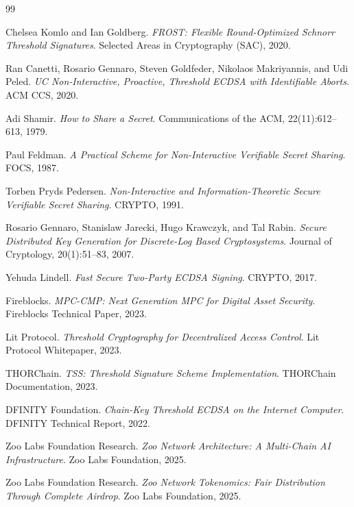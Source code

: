 \begin{thebibliography}{99}

Chelsea Komlo and Ian Goldberg.
\textit{FROST: Flexible Round-Optimized Schnorr Threshold Signatures}.
Selected Areas in Cryptography (SAC), 2020.

Ran Canetti, Rosario Gennaro, Steven Goldfeder, Nikolaos Makriyannis, and Udi Peled.
\textit{UC Non-Interactive, Proactive, Threshold ECDSA with Identifiable Aborts}.
ACM CCS, 2020.

Adi Shamir.
\textit{How to Share a Secret}.
Communications of the ACM, 22(11):612--613, 1979.

Paul Feldman.
\textit{A Practical Scheme for Non-Interactive Verifiable Secret Sharing}.
FOCS, 1987.

Torben Pryds Pedersen.
\textit{Non-Interactive and Information-Theoretic Secure Verifiable Secret Sharing}.
CRYPTO, 1991.

Rosario Gennaro, Stanislaw Jarecki, Hugo Krawczyk, and Tal Rabin.
\textit{Secure Distributed Key Generation for Discrete-Log Based Cryptosystems}.
Journal of Cryptology, 20(1):51--83, 2007.

Yehuda Lindell.
\textit{Fast Secure Two-Party ECDSA Signing}.
CRYPTO, 2017.

Fireblocks.
\textit{MPC-CMP: Next Generation MPC for Digital Asset Security}.
Fireblocks Technical Paper, 2023.

Lit Protocol.
\textit{Threshold Cryptography for Decentralized Access Control}.
Lit Protocol Whitepaper, 2023.

THORChain.
\textit{TSS: Threshold Signature Scheme Implementation}.
THORChain Documentation, 2023.

DFINITY Foundation.
\textit{Chain-Key Threshold ECDSA on the Internet Computer}.
DFINITY Technical Report, 2022.

Zoo Labs Foundation Research.
\textit{Zoo Network Architecture: A Multi-Chain AI Infrastructure}.
Zoo Labs Foundation, 2025.

Zoo Labs Foundation Research.
\textit{Zoo Network Tokenomics: Fair Distribution Through Complete Airdrop}.
Zoo Labs Foundation, 2025.


\end{thebibliography}
